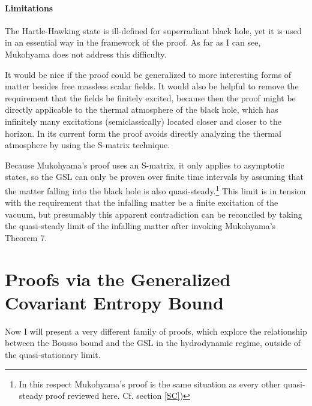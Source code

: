 \documentclass{article}
\begin{document}
\paragraph{Limitations}

The Hartle-Hawking state is ill-defined for superradiant black hole, yet it is used in an essential way in the framework of the proof.  As far as I can see, Mukohyama does not address this difficulty.

It would be nice if the proof could be generalized to more interesting forms of matter besides free massless scalar fields.  It would also be helpful to remove the requirement that the fields be finitely excited, because then the proof might be directly applicable to the thermal atmosphere of the black hole, which has infinitely many excitations (semiclassically) located closer and closer to the horizon.  In its current form the proof avoids directly analyzing the thermal atmosphere by using the S-matrix technique.

Because Mukohyama's proof uses an S-matrix, it only applies to asymptotic states, so the GSL can only be proven over finite time intervals by assuming that the matter falling into the black hole is also quasi-steady.\footnote{In this respect Mukohyama's proof is the same situation as every other quasi-steady proof reviewed here.  Cf. section \ref{SC})}  This limit is in tension with the requirement that the infalling matter be a finite excitation of the vacuum, but presumably this apparent contradiction can be reconciled by taking the quasi-steady limit of the infalling matter after invoking Mukohyama's Theorem 7.

\section{Proofs via the Generalized Covariant Entropy Bound}\label{BousB}

Now I will present a very different family of proofs, which explore the relationship between the Bousso bound and the GSL in the hydrodynamic regime, outside of the quasi-stationary limit.
\end{document}

